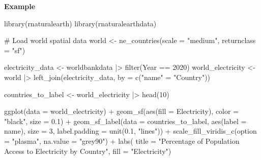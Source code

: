 \documentclass[
  letterpaper,
  DIV=11,
  numbers=noendperiod]{scrreprt}
\newenvironment{Shaded}{\begin{snugshade}}{\end{snugshade}}
\newcommand{\AttributeTok}[1]{\textcolor[rgb]{0.40,0.45,0.13}{#1}}
\newcommand{\CommentTok}[1]{\textcolor[rgb]{0.37,0.37,0.37}{#1}}
\newcommand{\DecValTok}[1]{\textcolor[rgb]{0.68,0.00,0.00}{#1}}
\newcommand{\FloatTok}[1]{\textcolor[rgb]{0.68,0.00,0.00}{#1}}
\newcommand{\FunctionTok}[1]{\textcolor[rgb]{0.28,0.35,0.67}{#1}}
\newcommand{\NormalTok}[1]{\textcolor[rgb]{0.00,0.23,0.31}{#1}}
\newcommand{\OtherTok}[1]{\textcolor[rgb]{0.00,0.23,0.31}{#1}}
\newcommand{\SpecialCharTok}[1]{\textcolor[rgb]{0.37,0.37,0.37}{#1}}
\newcommand{\StringTok}[1]{\textcolor[rgb]{0.13,0.47,0.30}{#1}}
\begin{document}
\textbf{Example}

\begin{Shaded}
\begin{Highlighting}[]
\FunctionTok{library}\NormalTok{(rnaturalearth)}
\FunctionTok{library}\NormalTok{(rnaturalearthdata)}

\CommentTok{\# Load world spatial data}
\NormalTok{world }\OtherTok{\textless{}{-}} \FunctionTok{ne\_countries}\NormalTok{(}\AttributeTok{scale =} \StringTok{"medium"}\NormalTok{, }\AttributeTok{returnclass =} \StringTok{"sf"}\NormalTok{)}

\NormalTok{electricity\_data }\OtherTok{\textless{}{-}}\NormalTok{ worldbankdata }\SpecialCharTok{|\textgreater{}} \FunctionTok{filter}\NormalTok{(Year }\SpecialCharTok{==} \DecValTok{2020}\NormalTok{)}
\NormalTok{world\_electricity }\OtherTok{\textless{}{-}}\NormalTok{ world }\SpecialCharTok{|\textgreater{}} 
  \FunctionTok{left\_join}\NormalTok{(electricity\_data, }\AttributeTok{by =} \FunctionTok{c}\NormalTok{(}\StringTok{"name"} \OtherTok{=} \StringTok{"Country"}\NormalTok{))}

\NormalTok{countries\_to\_label }\OtherTok{\textless{}{-}}\NormalTok{ world\_electricity }\SpecialCharTok{|\textgreater{}} \FunctionTok{head}\NormalTok{(}\DecValTok{10}\NormalTok{)}

\FunctionTok{ggplot}\NormalTok{(}\AttributeTok{data =}\NormalTok{ world\_electricity) }\SpecialCharTok{+}
  \FunctionTok{geom\_sf}\NormalTok{(}\FunctionTok{aes}\NormalTok{(}\AttributeTok{fill =}\NormalTok{ Electricity), }\AttributeTok{color =} \StringTok{"black"}\NormalTok{, }\AttributeTok{size =} \FloatTok{0.1}\NormalTok{) }\SpecialCharTok{+}
   \FunctionTok{geom\_sf\_label}\NormalTok{(}\AttributeTok{data =}\NormalTok{ countries\_to\_label, }\FunctionTok{aes}\NormalTok{(}\AttributeTok{label =}\NormalTok{ name), }\AttributeTok{size =} \DecValTok{3}\NormalTok{, }\AttributeTok{label.padding =} \FunctionTok{unit}\NormalTok{(}\FloatTok{0.1}\NormalTok{, }\StringTok{"lines"}\NormalTok{)) }\SpecialCharTok{+}
  \FunctionTok{scale\_fill\_viridis\_c}\NormalTok{(}\AttributeTok{option =} \StringTok{"plasma"}\NormalTok{, }\AttributeTok{na.value =} \StringTok{"grey90"}\NormalTok{) }\SpecialCharTok{+}
  \FunctionTok{labs}\NormalTok{(}
    \AttributeTok{title =} \StringTok{"Percentage of Population Access to Electricity by Country"}\NormalTok{,}
    \AttributeTok{fill =} \StringTok{"Electricity"}\NormalTok{)}
\end{Highlighting}
\end{Shaded}
\end{document}
